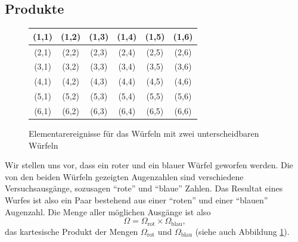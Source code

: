 \subsection{Produkte}
\begin{figure}
\begin{center}
\begin{tabular}{|c|c|c|c|c|c|}
\hline
(1,1)&(1,2)&(1,3)&(1,4)&(1,5)&(1,6)\\
\hline
(2,1)&(2,2)&(2,3)&(2,4)&(2,5)&(2,6)\\
\hline
(3,1)&(3,2)&(3,3)&(3,4)&(3,5)&(3,6)\\
\hline
(4,1)&(4,2)&(4,3)&(4,4)&(4,5)&(4,6)\\
\hline
(5,1)&(5,2)&(5,3)&(5,4)&(5,5)&(5,6)\\
\hline
(6,1)&(6,2)&(6,3)&(6,4)&(6,5)&(6,6)\\
\hline
\end{tabular}
\end{center}
\caption{Elementarereignisse für das Würfeln mit zwei unterscheidbaren
Würfeln\label{ereignisse-zwei-wuerfel}}
\end{figure}
Wir stellen uns vor, dass ein roter und ein blauer Würfel geworfen werden.
Die von den beiden Würfeln gezeigten Augenzahlen sind verschiedene
Versuchsausgänge, sozusagen ``rote'' und ``blaue'' Zahlen.
Das Resultat
eines Wurfes ist also ein Paar bestehend aus einer ``roten'' und
einer ``blauen'' Augenzahl.
Die Menge aller möglichen Ausgänge
ist also 
\[
\Omega = \Omega_{\text{rot}}\times\Omega_{\text{blau}},
\]
das kartesische Produkt der Mengen $\Omega_{\text{rot}}$ und
$\Omega_{\text{blau}}$ (siehe auch Abbildung \ref{ereignisse-zwei-wuerfel}).

